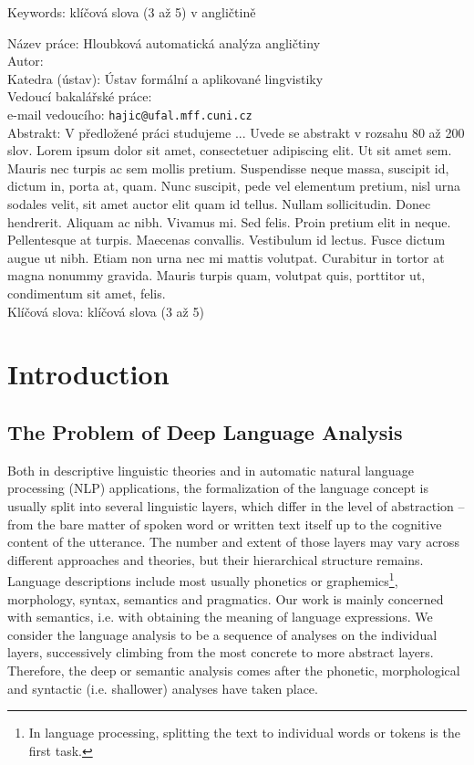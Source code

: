 \documentclass[12pt,notitlepage]{report}
\begin{document}
\noindent Keywords: klíčová slova (3 až 5) v angličtině

\vspace{10mm}
\noindent
Název práce: Hloubková automatická analýza angličtiny\\
Autor: \theauthor\\
Katedra (ústav): Ústav formální a aplikované lingvistiky\\
Vedoucí bakalářské práce: \thesupervisor\\
e-mail vedoucího: \texttt{hajic@ufal.mff.cuni.cz}\\

\noindent Abstrakt:  V předložené práci studujeme ... Uvede se abstrakt v rozsahu 80 až 200 slov. Lorem ipsum dolor sit amet, consectetuer adipiscing elit. Ut sit amet sem. Mauris nec turpis ac sem mollis pretium. Suspendisse neque massa, suscipit id, dictum in, porta at, quam. Nunc suscipit, pede vel elementum pretium, nisl urna sodales velit, sit amet auctor elit quam id tellus. Nullam sollicitudin. Donec hendrerit. Aliquam ac nibh. Vivamus mi. Sed felis. Proin pretium elit in neque. Pellentesque at turpis. Maecenas convallis. Vestibulum id lectus. Fusce dictum augue ut nibh. Etiam non urna nec mi mattis volutpat. Curabitur in tortor at magna nonummy gravida. Mauris turpis quam, volutpat quis, porttitor ut, condimentum sit amet, felis.\\

\noindent Klíčová slova: klíčová slova (3 až 5)


\cleardoublepage

\chapter{Introduction}\label{intro}

\section{The Problem of Deep Language Analysis}\label{problem}

Both in descriptive linguistic theories and in automatic natural language processing (NLP) applications, the formalization of the language concept is usually split into several linguistic layers, which differ in the level of abstraction -- from the bare matter of spoken word or written text itself up to the cognitive content of the utterance. The number and extent of those layers may vary across different approaches and theories, but their hierarchical structure remains. Language descriptions include most usually phonetics or graphemics\footnote{In language processing, splitting the text to individual words or tokens is the first task.}, morphology, syntax, semantics and pragmatics. Our work is mainly concerned with semantics, i.e. with obtaining the meaning of language expressions. We consider the language analysis to be a sequence of analyses on the individual layers, successively climbing from the most concrete to more abstract layers. Therefore, the deep or semantic analysis comes after the phonetic, morphological and syntactic (i.e. shallower) analyses have taken place.
\end{document}
